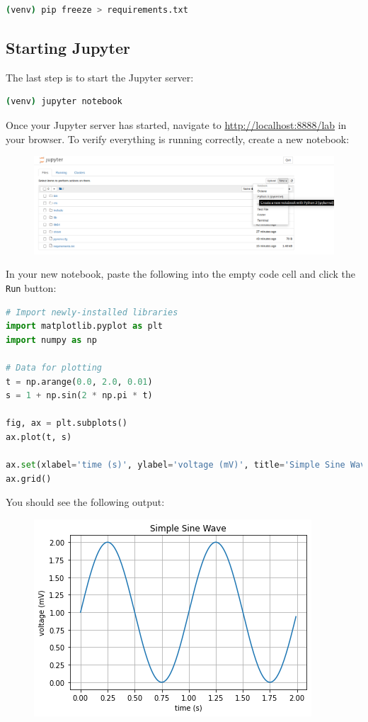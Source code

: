\documentclass[12pt]{article}
\begin{document}
\begin{lstlisting}[language=bash, caption=Save Project Dependencies (Windows)]
(venv) pip freeze > requirements.txt
\end{lstlisting}

\subsection{Starting Jupyter}\label{sec:jupyter-notebooks-starting-jupyter}

The last step is to start the Jupyter server:

\begin{lstlisting}[language=bash, caption=Starting Jupyter (Windows)]
(venv) jupyter notebook
\end{lstlisting}

\pagebreak
Once your Jupyter server has started, navigate to \url{http://localhost:8888/lab} in your browser.
To verify everything is running correctly, create a new notebook:

\begin{figure}[h]
  \includegraphics[width=\linewidth]{jupyter_home_new_notebook.png}%
\end{figure}

In your new notebook, paste the following into the empty code cell and click the \texttt{Run} button:

\begin{lstlisting}[language=Python, caption=Simple Sine Wave]
# Import newly-installed libraries
import matplotlib.pyplot as plt
import numpy as np

# Data for plotting
t = np.arange(0.0, 2.0, 0.01)
s = 1 + np.sin(2 * np.pi * t)

fig, ax = plt.subplots()
ax.plot(t, s)

ax.set(xlabel='time (s)', ylabel='voltage (mV)', title='Simple Sine Wave')
ax.grid()
\end{lstlisting}

You should see the following output:

\begin{figure}[h]
  \includegraphics[width=0.34\columnwidth]{jupyter_simple_sine_wave.png}%
\end{figure}
\end{document}
